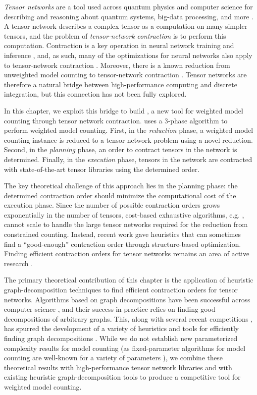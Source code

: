 \emph{Tensor networks} are a tool used across quantum physics and computer science for describing and reasoning about quantum systems, big-data processing, and more \cite{BB17,Cichocki14,Orus19}.
A tensor network describes a complex tensor as a computation on many simpler tensors, and the problem of \emph{tensor-network contraction} is to perform this computation. 
Contraction is a key operation in neural network training and inference \cite{BK07,Hirata03,KKCLA17,VZTGDMVAC18}, and, as such, many of the optimizations for neural networks also apply to tensor-network contraction \cite{KSTKPPRS19,NRBHHJN15,RMGZFZHVL19}.
Moreover, there is a known reduction from unweighted model counting to tensor-network contraction \cite{BMT15}.
Tensor networks are therefore a natural bridge between high-performance computing and discrete integration, but this connection has not been fully explored.

In this chapter, we exploit this bridge to build , a new tool for weighted model counting through tensor network contraction.  uses a 3-phase algorithm to perform weighted model counting. First, in the \emph{reduction} phase, a weighted model counting instance is reduced to a tensor-network problem using a novel reduction. Second, in the \emph{planning} phase, an order to contract tensors in the network is determined. Finally, in the \emph{execution} phase, tensors in the network are contracted with state-of-the-art tensor libraries using the determined order.

The key theoretical challenge of this approach lies in the planning phase: the determined contraction order should minimize the computational cost of the execution phase. Since the number of possible contraction orders grows exponentially in the number of tensors, cost-based exhaustive algorithms, e.g. \cite{PHV14}, cannot scale to handle the large tensor networks required for the reduction from constrained counting. Instead, recent work \cite{KCMR18} gave heuristics that can sometimes find a ``good-enough'' contraction order through structure-based optimization. Finding efficient contraction orders for tensor networks remains an area of active research \cite{RTPCTSL19}.

The primary theoretical contribution of this chapter is the application of heuristic graph-decomposition techniques to find efficient contraction orders for tensor networks. Algorithms based on graph decompositions have been successful across computer science \cite{MPPV04,GLST17}, and their success in practice relies on finding good decompositions of arbitrary graphs. This, along with several recent competitions \cite{DKTW18}, has spurred the development of a variety of heuristics and tools for efficiently finding graph decompositions \cite{AMW17,HS18,Tamaki17}. While we do not establish new parameterized complexity results for model counting (as fixed-parameter algorithms for model counting are well-known for a variety of parameters \cite{FMR08,SS10}), we combine these theoretical results with high-performance tensor network libraries and with existing heuristic graph-decomposition tools to produce a competitive tool for weighted model counting.


